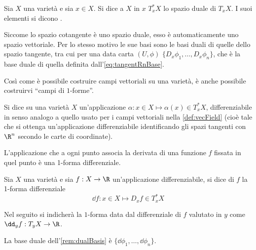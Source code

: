 \begin{definition}
  Sia $X$ una varietà e sia $x \in X$. Si dice  a $X$ in $x$ $T_x^* X$ lo spazio duale di $T_x X$. I suoi elementi si dicono .
\end{definition}
\begin{remark} \label{rem:dualBasis}
  Siccome lo spazio cotangente è uno spazio duale, esso è automaticamente uno spazio vettoriale. Per lo stesso motivo le sue basi sono le basi duali di quelle dello spazio tangente, tra cui per una data carta $(U, \phi)$ $\{D_x \phi_1, \ldots, D_x \phi_n\} $, che è la base duale di quella definita dall'\autoref{eq:tangentRnBase}.
\end{remark}

Così come è possibile costruire campi vettoriali su una varietà, è anche possibile costruirvi \textquotedblleft campi di $1$-forme\textquotedblright.
\begin{definition} \label{def:1formCvc}
  Si dice  su una varietà $X$ un'applicazione $\alpha: x \in X \mapsto \alpha(x) \in T_x^* X$, differenziabile in senso analogo a quello usato per i campi vettoriali nella \autoref{def:vecField} (cioè tale che si ottenga un'applicazione differenziabile identificando gli spazi tangenti con $\R^{n}$ secondo le carte di coordinate).
\end{definition}

L'applicazione che a ogni punto associa la derivata di una funzione $f$ fissata in quel punto è una 1-forma differenziale.
\begin{definition} \label{def:differential}
  Sia $X$ una varietà e sia $f:X\to \R$ un'applicazione differenziabile, si dice  di $f$ la 1-forma differenziale \begin{equation}
  \dd f: x \in X \mapsto D_x f \in T_x^* X
  \end{equation} 
\end{definition}
\begin{remark}
  Nel seguito si indicherà la $1$-forma data dal differenziale di $f$ valutato in $y$ come $\dd_y f:T_y X \to \R$.
\end{remark}
\begin{remark}
  La base duale dell'\autoref{rem:dualBasis} è $\{ \dd{\phi_1}, \ldots, \dd{\phi_n}\}$.
\end{remark}

